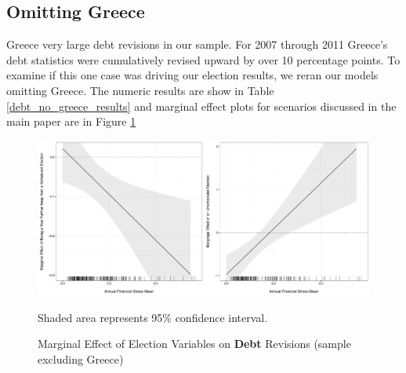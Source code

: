 \documentclass[]{article}
\begin{document}
\subsection*{Omitting Greece}

Greece very large debt revisions in our sample. For 2007 through 2011 Greece's debt statistics were cumulatively revised upward by over 10 percentage points. To examine if this one case was driving our election results, we reran our models omitting Greece. The numeric results are show in Table \ref{debt_no_greece_results} and marginal effect plots for scenarios discussed in the main paper are in Figure \ref{me_no_greece}



\begin{figure}
    \caption{Marginal Effect of Election Variables on \textbf{Debt} Revisions (sample excluding Greece)}
    \label{me_no_greece}

    \begin{center}
        \includegraphics[scale=0.4]{figures/debt_me_nogreece.pdf}
    \end{center}

	{\scriptsize{Shaded area represents 95\% confidence interval.}}

\end{figure}
\end{document}
